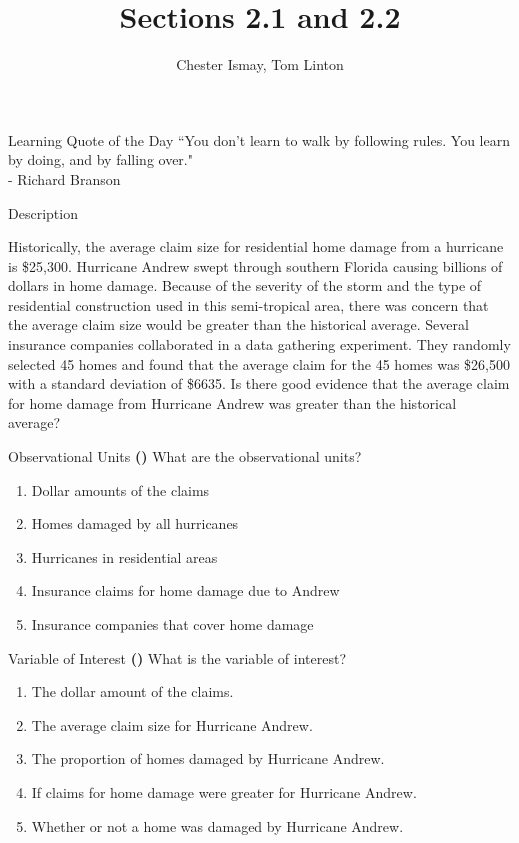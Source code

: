 \documentclass[13pt]{beamer}
\title{Sections 2.1 and 2.2}
\author{Chester Ismay, Tom Linton}
\institute{Ripon College, Central College}
\date{}
\newcounter{count}
\newcommand{\quotes}[2]{\centering \Large{``#1"\\
\vspace*{0.2in}
\hspace*{0.5in} - #2}}
\newcommand{\question}{ \textbf{(\decimal{count})} \stepcounter{count}}
\begin{document}
\begin{frame}
  \titlepage
\end{frame}


\begin{frame}{Learning Quote of the Day}
\quotes{You don't learn to walk by following rules. You learn by doing, and by falling over.}{Richard Branson}
\end{frame}

\begin{frame}{Description}


Historically, the average claim size for residential home damage from a hurricane is \$25,300. Hurricane Andrew swept through southern Florida causing billions of dollars in home damage. Because of the severity of the storm and the type of residential construction used in this semi-tropical area, there was concern that the average claim size would be greater than the historical average. Several insurance companies collaborated in a data gathering experiment. They randomly selected 45 homes and found that the average claim for the 45 homes was \$26,500 with a standard deviation of \$6635. Is there good evidence that the average claim for home damage from Hurricane Andrew was greater than the historical average?
\end{frame}

\begin{frame}{Observational Units}
\question What are the observational units?
\begin{enumerate}[A]
   \item Dollar amounts of the claims
   \item Homes damaged by all hurricanes
   \item Hurricanes in residential areas
   \item Insurance claims for home damage due to Andrew%
   \item Insurance companies that cover home damage
\end{enumerate}
\end{frame}

\begin{frame}{Variable of Interest}
\question What is the variable of interest?
\begin{enumerate}[A]
   \item The dollar amount of the claims.%
   \item The average claim size for Hurricane Andrew.
   \item The proportion of homes damaged by Hurricane Andrew.
   \item If claims for home damage were greater for Hurricane Andrew.
   \item Whether or not a home was damaged by Hurricane Andrew.
\end{enumerate}
\end{frame}
\end{document}
